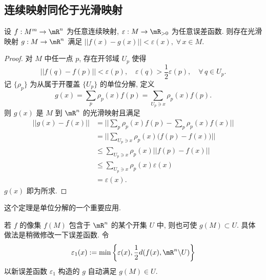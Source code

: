     \subsection{连续映射同伦于光滑映射}
        \begin{theorem}[用光滑映射逼近连续映射]
            设 $f:M^m\rightarrow\mR^n$ 为任意连续映射, $\varepsilon:M\rightarrow\mR_{>0}$ 为任意误差函数.
            则存在光滑映射 $g:M\rightarrow\mR^n$ 满足 $||f(x)-g(x)||<\varepsilon(x),\;\forall\,x\in M$.
        \end{theorem}
        \begin{proof}
            对 $M$ 中任一点 $p$, 存在开邻域 $U_p$ 使得 
            \begin{equation*}
                ||f(q)-f(p)||<\varepsilon(p),\quad\varepsilon(q)>\frac{1}{2}\varepsilon(p),\quad\forall\,q\in U_p.
            \end{equation*}
            记 $\{\rho_p\}$ 为从属于开覆盖 $\{U_p\}$ 的单位分解, 定义 
            \begin{equation*}
                g(x) = \sum_{p}\rho_p(x)f(p) = \sum_{U_p\ni x}\rho_p(x)f(p).
            \end{equation*}
            则 $g(x)$ 是 $M$ 到 $\mR^n$ 的光滑映射且满足 
            \begin{align*}
                ||g(x)-f(x)|| &= \Big|\Big|\sum_{p}\rho_p(x)f(p) - \sum_{p}\rho_p(x)f(x)\Big|\Big| \\
                &= \Big|\Big|\sum_{U_p\ni x}\rho_p(x)\Big(f(p)-f(x)\Big)\Big|\Big| \\
                &\leqslant\sum_{U_p\ni x}\rho_p(x)\big|\big|f(p)-f(x)\big|\big| \\
                &\leqslant\sum_{U_p\ni x}\rho_p(x)\varepsilon(x) \\
                &=\varepsilon(x).
            \end{align*}
            $g(x)$ 即为所求.
        \end{proof}
        \begin{remark}
            这个定理是单位分解的一个重要应用.
        \end{remark}
        \begin{remark}
            若 $f$ 的像集 $f(M)$ 包含于 $\mR^n$ 的某个开集 $U$ 中, 则也可使 $g(M)\subset U$. 具体做法是稍微修改一下误差函数.
            令 
            \begin{equation*}
                \varepsilon_1(x):=\min\left\{\varepsilon(x),\frac{1}{2}d(f(x),\mR^n\backslash U)\right\}
            \end{equation*} 
            以新误差函数 $\varepsilon_1$ 构造的 $g$ 自动满足 $g(M)\in U$.
        \end{remark}
